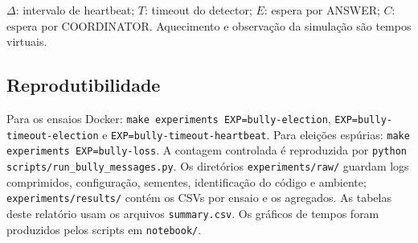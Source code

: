 \documentclass[conference]{IEEEtran}
\begin{document}
\begin{table}[t]
\centering
\caption{Experimentos: parâmetro variado, níveis, valores fixos e protocolo.}
\label{tab:experimentos}
\footnotesize
{}

\smallskip
\parbox{\textwidth}{\scriptsize $\Delta$: intervalo de heartbeat; $T$: timeout do detector; $E$: espera por ANSWER; $C$: espera por COORDINATOR. Aquecimento e observação da simulação são tempos virtuais.}
\end{table}

\subsection{Reprodutibilidade}
\label{sec:reprodutibilidade}

Para os ensaios Docker: \texttt{make experiments EXP=bully-election}, \texttt{EXP=bully-timeout-election} e \texttt{EXP=bully-timeout-heartbeat}. Para eleições espúrias: \texttt{make experiments EXP=bully-loss}. A contagem controlada é reproduzida por \texttt{python scripts/run\_bully\_messages.py}. Os diretórios \texttt{experiments/raw/} guardam logs comprimidos, configuração, sementes, identificação do código e ambiente; \texttt{experiments/results/} contém os CSVs por ensaio e os agregados. As tabelas deste relatório usam os arquivos \texttt{summary.csv}. Os gráficos de tempos foram produzidos pelos scripts em \texttt{notebook/}.
\end{document}
